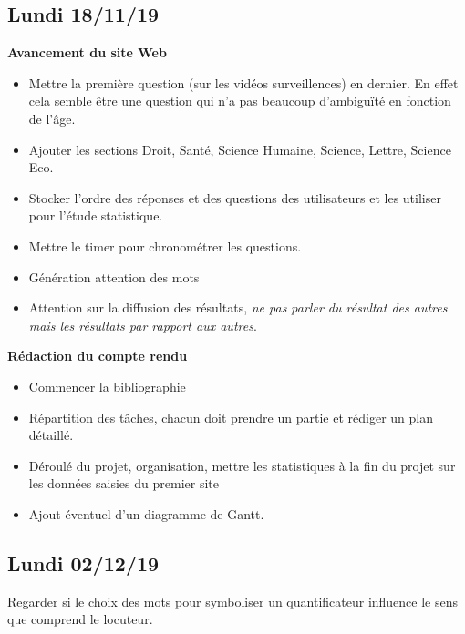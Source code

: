 \documentclass[11pt,letterpaper]{article}
\begin{document}
\vspace{5px}

\subsection{Lundi 18/11/19}

\textbf{Avancement du site Web }
\begin{itemize}
\item Mettre la première question (sur les vidéos surveillences) en dernier. En effet cela semble être une question qui n'a pas beaucoup d'ambiguïté en fonction de l'âge.
\item Ajouter les sections Droit, Santé, Science Humaine, Science, Lettre, Science Eco.
\item Stocker l'ordre des réponses et des questions des utilisateurs et les utiliser pour l'étude statistique.
\item Mettre le timer pour chronométrer les questions.
\item Génération attention des mots
\item  Attention sur la diffusion des résultats, \textit{ne pas parler du résultat des autres mais les résultats par rapport aux autres}.
\end{itemize}
\textbf{Rédaction du compte rendu}
\begin{itemize}
\item Commencer la bibliographie
\item Répartition des tâches, chacun doit prendre un partie et rédiger un plan détaillé.
\item Déroulé du projet, organisation, mettre les statistiques à la fin du projet sur les données saisies du premier site
\item Ajout éventuel d'un diagramme de Gantt.
\end{itemize}

\vspace{8px}

\subsection{Lundi 02/12/19}
Regarder si le choix des mots pour symboliser un quantificateur influence le sens que comprend le locuteur.
\vspace{5mm}

\vspace{8px}
\end{document}
